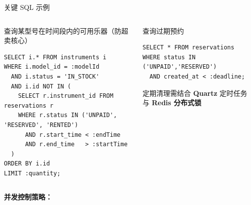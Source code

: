 \documentclass[aspectratio=169,10pt]{beamer}
\begin{document}
\begin{frame}[fragile]{关键 SQL 示例}
  \vspace{4pt}
  \begin{columns}[T]
    \begin{block}{查询某型号在时间段内的可用乐器（防超卖核心）}
      \tiny
      \begin{verbatim}
SELECT i.* FROM instruments i
WHERE i.model_id = :modelId
  AND i.status = 'IN_STOCK'
  AND i.id NOT IN (
    SELECT r.instrument_id FROM reservations r
    WHERE r.status IN ('UNPAID', 'RESERVED', 'RENTED')
      AND r.start_time < :endTime
      AND r.end_time   > :startTime
  )
ORDER BY i.id
LIMIT :quantity;
      \end{verbatim}
    \end{block}

    \begin{exampleblock}{查询过期预约}
      \footnotesize
      \begin{verbatim}
SELECT * FROM reservations
WHERE status IN ('UNPAID','RESERVED')
  AND created_at < :deadline;
      \end{verbatim}

      {\footnotesize
      定期清理需结合 \textbf{Quartz} 定时任务与 \textbf{Redis 分布式锁}
      }
    \end{exampleblock}
  \end{columns}

  \vspace{6pt}
  \textbf{并发控制策略：}
  \begin{center}
  \end{center}
\end{frame}
\end{document}
